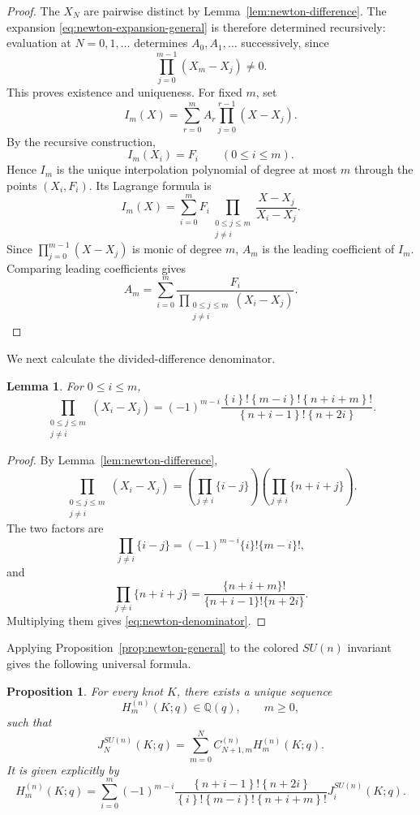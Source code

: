 \documentclass[11pt]{amsart}
\newtheorem{proposition}[theorem]{Proposition}
\newtheorem{lemma}[theorem]{Lemma}
\newcommand{\Q}{\mathbb Q}
\newcommand{\curly}[1]{\left\{#1\right\}}
\begin{document}
\begin{proof}
The \(X_N\) are pairwise distinct by
Lemma~\ref{lem:newton-difference}.  The expansion
\eqref{eq:newton-expansion-general} is therefore determined recursively:
evaluation at \(N=0,1,\ldots\) determines \(A_0,A_1,\ldots\)
successively, since
\[
\prod_{j=0}^{m-1}(X_m-X_j)\neq0.
\]
This proves existence and uniqueness.
For fixed \(m\), set
\[
I_m(X)
=
\sum_{r=0}^{m}
A_r\prod_{j=0}^{r-1}(X-X_j).
\]
By the recursive construction,
\[
I_m(X_i)=F_i
\qquad (0\leq i\leq m).
\]
Hence \(I_m\) is the unique interpolation polynomial of degree at
most \(m\) through the points \((X_i,F_i)\). Its Lagrange formula is
\[
I_m(X)
=
\sum_{i=0}^{m}
F_i
\prod_{\substack{0\leq j\leq m\\ j\neq i}}
\frac{X-X_j}{X_i-X_j}.
\]
Since
\(
\prod_{j=0}^{m-1}(X-X_j)
\)
is monic of degree \(m\), \(A_m\) is the leading coefficient of
\(I_m\). Comparing leading coefficients gives
\[
A_m
=
\sum_{i=0}^{m}
\frac{F_i}
{\displaystyle
\prod_{\substack{0\leq j\leq m\\ j\neq i}}
(X_i-X_j)}.
\]
\end{proof}

We next calculate the divided-difference denominator.

\begin{lemma}\label{lem:newton-denominator}
For \(0\leq i\leq m\),
\begin{equation}\label{eq:newton-denominator}
\prod_{\substack{0\leq j\leq m\\j\neq i}}
(X_i-X_j)
=
(-1)^{m-i}
\frac{
\curly{i}!\curly{m-i}!\curly{n+i+m}!
}{
\curly{n+i-1}!\curly{n+2i}
}.
\end{equation}
\end{lemma}
\begin{proof}
By Lemma~\ref{lem:newton-difference},
\[
\prod_{\substack{0\leq j\leq m\\j\neq i}}
(X_i-X_j)
=
\left(\prod_{j\neq i}\{i-j\}\right)
\left(\prod_{j\neq i}\{n+i+j\}\right).
\]
The two factors are
\[
\prod_{j\neq i}\{i-j\}
=
(-1)^{m-i}\{i\}!\{m-i\}!,
\]
and
\[
\prod_{j\neq i}\{n+i+j\}
=
\frac{\{n+i+m\}!}
{\{n+i-1\}!\{n+2i\}}.
\]
Multiplying them gives \eqref{eq:newton-denominator}.
\end{proof}
Applying Proposition~\ref{prop:newton-general} to the colored
\(SU(n)\) invariant gives the following universal formula.

\begin{proposition}\label{prop:H-universal}
For every knot \(K\), there exists a unique sequence
\[
H_m^{(n)}(K;q)\in\Q(q),
\qquad m\geq0,
\]
such that
\[
J_N^{SU(n)}(K;q)
=
\sum_{m=0}^{N}
C_{N+1,m}^{(n)}
H_m^{(n)}(K;q).
\]
It is given explicitly by
\begin{equation}\label{eq:H-universal}
H_m^{(n)}(K;q)
=
\sum_{i=0}^{m}
(-1)^{m-i}
\frac{
\curly{n+i-1}!\curly{n+2i}
}{
\curly{i}!\curly{m-i}!\curly{n+i+m}!
}
J_i^{SU(n)}(K;q).
\end{equation}
\end{proposition}
\end{document}
